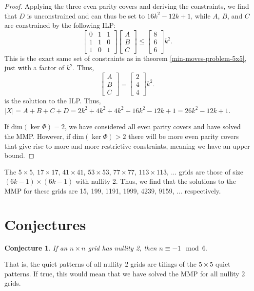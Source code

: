 \documentclass[a4paper]{article}
\newtheorem{conjecture}{Conjecture}
\newcommand{\abs}[1]{\left| #1 \right|}
\renewcommand{\dim}[1]{\text{dim}\left( #1 \right)}
\begin{document}
\begin{proof}
		Applying the three even parity covers and deriving the constraints, we find that $D$ is unconstrained and can thus be set to $16k^2 - 12k + 1$, while $A$, $B$, and $C$ are constrained by the following ILP:
		\begin{equation}
			\begin{bmatrix}
				0 & 1 & 1 \\
				1 & 1 & 0 \\
				1 & 0 & 1 
			\end{bmatrix}
			\begin{bmatrix}
				A \\
				B \\
				C
			\end{bmatrix}
			\leq
			\begin{bmatrix}
				8 \\
				6 \\
				6
			\end{bmatrix}k^2.
		\end{equation}
		This is the exact same set of constraints as in theorem \ref{min-moves-problem-5x5}, just with a factor of $k^2$.
		Thus,
		\begin{equation*}
			\begin{bmatrix}
				A \\
				B \\
				C
			\end{bmatrix}
			=
			\begin{bmatrix}
				2 \\
				4 \\
				4
			\end{bmatrix}k^2.
		\end{equation*}
		is the solution to the ILP.
		Thus, $\abs{X} = A + B + C + D = 2k^2 + 4k^2 +  4k^2 + 16k^2 - 12k + 1 = 26k^2 - 12k + 1$.
		
		If $\dim{\ker{\Phi}} = 2$, we have considered all even parity covers and have solved the MMP.
		However, if $\dim{\ker{\Phi}} > 2$ there will be more even parity covers that give rise to more and more restrictive constraints, meaning we have an upper bound.
	\end{proof}

	The $5 \times 5$, $17 \times 17$, $41 \times 41$, $53 \times 53$, $77 \times 77$, $113 \times 113$, $\dots$ grids are those of size $(6k-1) \times (6k-1)$ with nullity 2.
	Thus, we find that the solutions to the MMP for these grids are 15, 199, 1191, 1999, 4239, 9159, $\dots$ respectively.
	
	\section{Conjectures}
	\begin{conjecture}\label{all-nullity2-conj}
		If an $n \times n$ grid has nullity 2, then $n \equiv -1 \mod 6$.
	\end{conjecture}
	That is, the quiet patterns of all nullity 2 grids are tilings of the $5 \times 5$ quiet patterns.
	If true, this would mean that we have solved the MMP for all nullity 2 grids.
\end{document}
